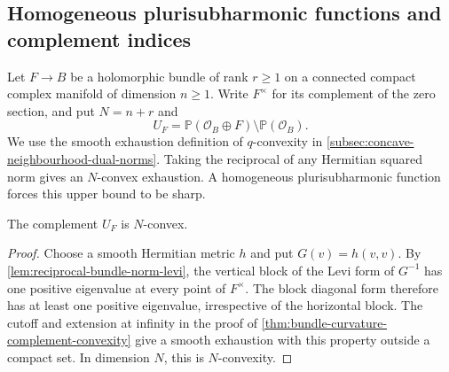 \subsection{Homogeneous plurisubharmonic functions and complement indices}
\label{subsec:homogeneous-psh-complement-index}

Let $F\to B$ be a holomorphic bundle of rank $r\geq1$ on a connected compact complex manifold of dimension $n\geq1$. Write $F^\times$ for its complement of the zero section, and put $N=n+r$ and
\[
 U_F=\mathbb P(\mathcal O_B\oplus F)\setminus\mathbb P(\mathcal O_B).
\]
We use the smooth exhaustion definition of $q$-convexity in \cref{subsec:concave-neighbourhood-dual-norms}. Taking the reciprocal of any Hermitian squared norm gives an $N$-convex exhaustion. A homogeneous plurisubharmonic function forces this upper bound to be sharp.

\begin{lemma}\label{lem:universal-bundle-complement-index-bound}
The complement $U_F$ is $N$-convex.
\end{lemma}
\begin{proof}
Choose a smooth Hermitian metric $h$ and put $G(v)=h(v,v)$. By \cref{lem:reciprocal-bundle-norm-levi}, the vertical block of the Levi form of $G^{-1}$ has one positive eigenvalue at every point of $F^\times$. The block diagonal form therefore has at least one positive eigenvalue, irrespective of the horizontal block. The cutoff and extension at infinity in the proof of \cref{thm:bundle-curvature-complement-convexity} give a smooth exhaustion with this property outside a compact set. In dimension $N$, this is $N$-convexity.
\end{proof}

